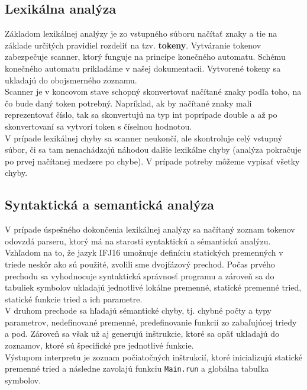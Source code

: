 \documentclass[12pt, a4paper]{article}
\begin{document}
		\subsection{Lexikálna analýza} \label{sec:KA}
			Základom lexikálnej analýzy je zo vstupného súboru načítať znaky a tie na základe určitých pravidiel rozdeliť na tzv. \textbf{tokeny}. Vytváranie tokenov zabezpečuje scanner, ktorý funguje na princípe konečného automatu. Schému konečného automatu prikladáme v našej dokumentacii. Vytvorené tokeny sa ukladajú do obojsmerného zoznamu. \\
			Scanner je v koncovom stave schopný skonvertovať načítané znaky podľa toho, na čo bude daný token potrebný. Napríklad, ak by načítané znaky mali reprezentovať číslo, tak sa skonvertujú na typ int poprípade double a až po skonvertovaní sa vytvorí token s číselnou hodnotou. \\
			V prípade lexikálnej chyby sa scanner neukončí, ale skontroluje celý vstupný súbor, či sa tam nenachádzajú náhodou dalšie lexikálne chyby (analýza pokračuje po prvej načítanej medzere po chybe). V prípade potreby môžeme vypisať všetky chyby.

        \subsection{Syntaktická a semantická analýza}
			V prípade úspešného dokončenia lexikálnej analýzy sa načítaný zoznam tokenov odovzdá parseru, ktorý má na starosti syntaktickú a sémantickú analýzu.\\
			Vzhľadom na to, že jazyk IFJ16 umožnuje definíciu statických premenných v triede neskôr ako sú použité, zvolili sme dvojfázový prechod. Počas prvého prechodu sa vyhodnocuje syntaktická správnosť programu a zároveň sa do tabuliek symbolov ukladajú jednotlivé lokálne premenné, statické premenné tried, statické funkcie tried a ich parametre.\\
			V druhom prechode sa hľadajú sémantické chyby, tj. chybné počty a typy parametrov, nedefinované premenné, predefinovanie funkcií zo zabaľujúcej triedy a pod. Zároveň sa však už aj generujú inštrukcie, ktoré sa opäť ukladajú do zoznamov, ktoré sú špecifické pre jednotlivé funkcie.\\
			Výstupom interpretu je zoznam počiatočných inštrukcií, ktoré inicializujú statické premenné tried a následne zavolajú funkciu \verb|Main.run| a globálna tabuľka symbolov.
	        
\end{document}
